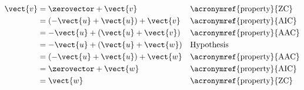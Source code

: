 \begin{align*}
\vect{v}
&= \zerovector + \vect{v}&&\text{\acronymref{property}{ZC}}\\
&= (-\vect{u} + \vect{u}) + \vect{v}&&\text{\acronymref{property}{AIC}}\\
&= -\vect{u} + (\vect{u} + \vect{v})&&\text{\acronymref{property}{AAC}}\\
&= -\vect{u} + (\vect{u} + \vect{w})&&\text{Hypothesis}\\
&= (-\vect{u} + \vect{u}) + \vect{w}&&\text{\acronymref{property}{AAC}}\\
&= \zerovector + \vect{w}&&\text{\acronymref{property}{AIC}}\\
&= \vect{w}&&\text{\acronymref{property}{ZC}}\\
\end{align*}
